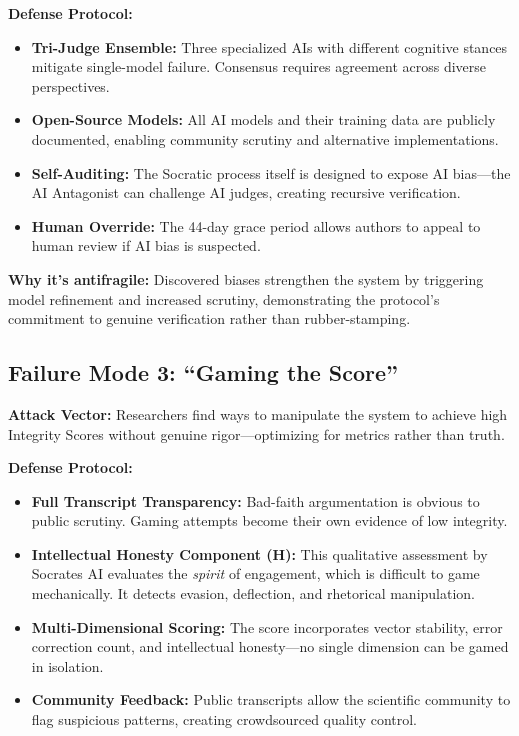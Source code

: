 \documentclass[11pt,a4paper]{article}
\begin{document}
\textbf{Defense Protocol:}
\begin{itemize}[nosep]
    \item \textbf{Tri-Judge Ensemble:} Three specialized AIs with different cognitive stances mitigate single-model failure. Consensus requires agreement across diverse perspectives.
    \item \textbf{Open-Source Models:} All AI models and their training data are publicly documented, enabling community scrutiny and alternative implementations.
    \item \textbf{Self-Auditing:} The Socratic process itself is designed to expose AI bias—the AI Antagonist can challenge AI judges, creating recursive verification.
    \item \textbf{Human Override:} The 44-day grace period allows authors to appeal to human review if AI bias is suspected.
\end{itemize}

\textbf{Why it's antifragile:} Discovered biases strengthen the system by triggering model refinement and increased scrutiny, demonstrating the protocol's commitment to genuine verification rather than rubber-stamping.

\subsection{Failure Mode 3: ``Gaming the Score''}
\textbf{Attack Vector:} Researchers find ways to manipulate the system to achieve high Integrity Scores without genuine rigor—optimizing for metrics rather than truth.

\textbf{Defense Protocol:}
\begin{itemize}[nosep]
    \item \textbf{Full Transcript Transparency:} Bad-faith argumentation is obvious to public scrutiny. Gaming attempts become their own evidence of low integrity.
    \item \textbf{Intellectual Honesty Component (H):} This qualitative assessment by Socrates AI evaluates the \textit{spirit} of engagement, which is difficult to game mechanically. It detects evasion, deflection, and rhetorical manipulation.
    \item \textbf{Multi-Dimensional Scoring:} The score incorporates vector stability, error correction count, and intellectual honesty—no single dimension can be gamed in isolation.
    \item \textbf{Community Feedback:} Public transcripts allow the scientific community to flag suspicious patterns, creating crowdsourced quality control.
\end{itemize}
\end{document}
